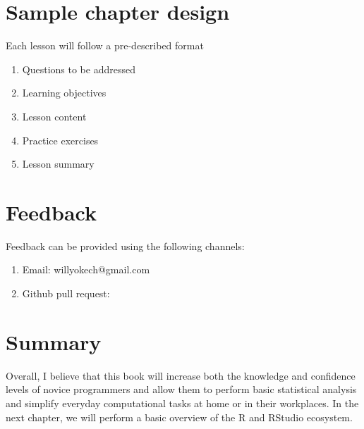 \documentclass[
  letterpaper,
  DIV=11,
  numbers=noendperiod]{scrreprt}
\begin{document}
\hypertarget{sample-chapter-design}{%
\section*{Sample chapter design}\label{sample-chapter-design}}


Each lesson will follow a pre-described format

\begin{enumerate}
\def\labelenumi{\roman{enumi}.}
\item
  Questions to be addressed
\item
  Learning objectives
\item
  Lesson content
\item
  Practice exercises
\item
  Lesson summary
\end{enumerate}

\hypertarget{feedback}{%
\section*{Feedback}\label{feedback}}


Feedback can be provided using the following channels:

\begin{enumerate}
\def\labelenumi{\roman{enumi}.}
\item
  Email: willyokech@gmail.com
\item
  Github pull request:
\end{enumerate}

\hypertarget{summary}{%
\section*{Summary}\label{summary}}


Overall, I believe that this book will increase both the knowledge and
confidence levels of novice programmers and allow them to perform basic
statistical analysis and simplify everyday computational tasks at home
or in their workplaces. In the next chapter, we will perform a basic
overview of the R and RStudio ecosystem.

\end{document}
